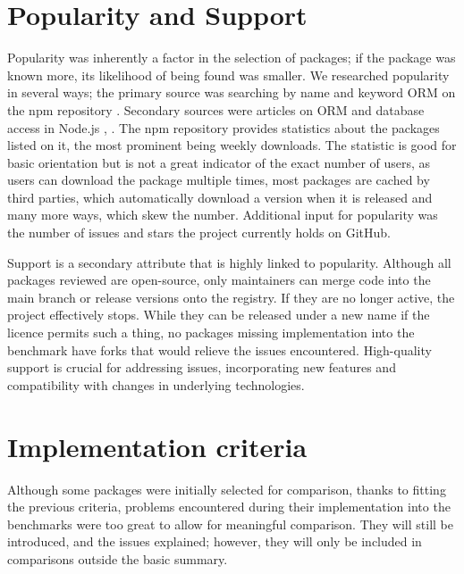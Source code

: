 \section{Popularity and Support}
Popularity was inherently a factor in the selection of packages; if the package
was known more, its likelihood of being found was smaller. We researched
popularity in several ways; the primary source was searching by name and keyword
ORM on the npm repository \cite{npmSearchORM}. Secondary sources were articles
on ORM and database access in Node.js \cite{SitePoint_2021}, \cite{Wang_2020}.
The npm repository provides statistics about the packages listed on it, the most
prominent being weekly downloads. The statistic is good for basic orientation
but is not a great indicator of the exact number of users, as users can download
the package multiple times, most packages are cached by third parties, which
automatically download a version when it is released and many more ways, which
skew the number. Additional input for popularity was the number of issues and
stars the project currently holds on GitHub.

Support is a secondary attribute that is highly linked to popularity. Although
all packages reviewed are open-source, only maintainers can merge code into the
main branch or release versions onto the registry. If they are no longer active,
the project effectively stops. While they can be released under a new name if
the licence permits such a thing, no packages missing implementation into the
benchmark have forks that would relieve the issues encountered. High-quality
support is crucial for addressing issues, incorporating new features and
compatibility with changes in underlying technologies.

\section{Implementation criteria}
Although some packages were initially selected for comparison, thanks to fitting
the previous criteria, problems encountered during their implementation into the
benchmarks were too great to allow for meaningful comparison. They will still be
introduced, and the issues explained; however, they will only be included in
comparisons outside the basic summary.
